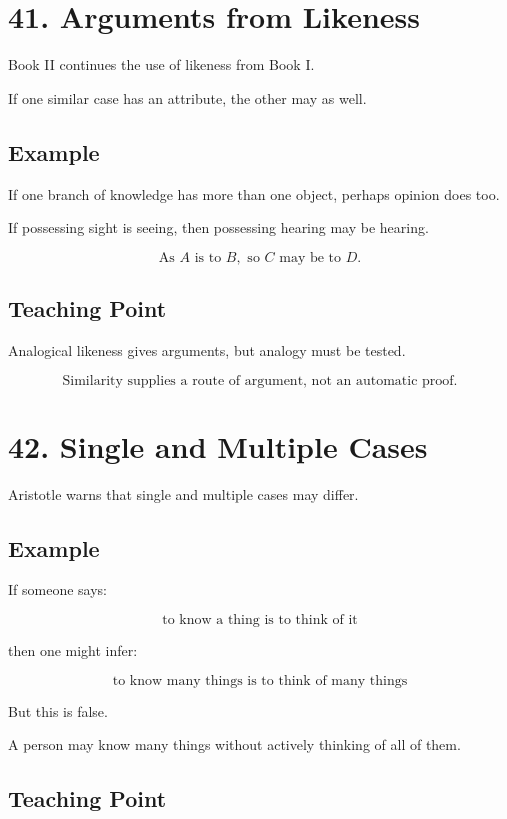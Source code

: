 \documentclass[12pt]{article}
\begin{document}
\section*{41. Arguments from Likeness}

Book II continues the use of likeness from Book I.

If one similar case has an attribute, the other may as well.

\subsection*{Example}

If one branch of knowledge has more than one object, perhaps opinion does too.

If possessing sight is seeing, then possessing hearing may be hearing.

\[
\text{As } A \text{ is to } B, \text{ so } C \text{ may be to } D.
\]

\subsection*{Teaching Point}

Analogical likeness gives arguments, but analogy must be tested.

\[
\boxed{
\text{Similarity supplies a route of argument, not an automatic proof.}
}
\]

\section*{42. Single and Multiple Cases}

Aristotle warns that single and multiple cases may differ.

\subsection*{Example}

If someone says:

\[
\text{to know a thing is to think of it}
\]

then one might infer:

\[
\text{to know many things is to think of many things}
\]

But this is false.

A person may know many things without actively thinking of all of them.

\subsection*{Teaching Point}
\end{document}
